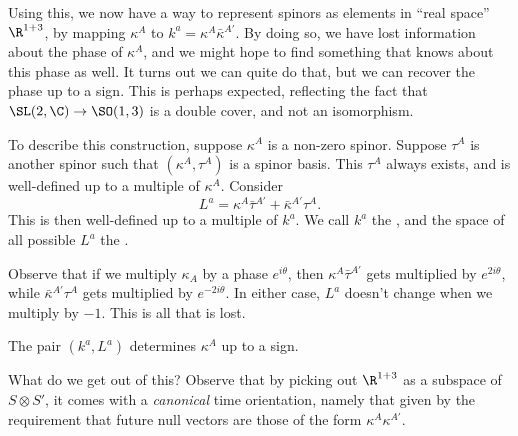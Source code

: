 \documentclass[a4paper]{article}
\begin{document}
Using this, we now have a way to represent spinors as elements in ``real space'' $\R^{1 + 3}$, by mapping $\kappa^A$ to $k^a = \kappa^A \bar{\kappa}^{A'}$. By doing so, we have lost information about the phase of $\kappa^A$, and we might hope to find something that knows about this phase as well. It turns out we can quite do that, but we can recover the phase up to a sign. This is perhaps expected, reflecting the fact that $\SL(2, \C) \to \SO(1, 3)$ is a double cover, and not an isomorphism.

To describe this construction, suppose $\kappa^A$ is a non-zero spinor. Suppose $\tau^A$ is another spinor such that $(\kappa^A, \tau^A)$ is a spinor basis. This $\tau^A$ always exists, and is well-defined up to a multiple of $\kappa^A$. Consider
\[
  L^a = \kappa^A \bar{\tau}^{A'} + \bar{\kappa}^{A'} \tau^A.
\]
This is then well-defined up to a multiple of $k^a$. We call $k^a$ the , and the space of all possible $L^a$ the .

Observe that if we multiply $\kappa_A$ by a phase $e^{i\theta}$, then $\kappa^A \bar{\tau}^{A'}$ gets multiplied by $e^{2i\theta}$, while $\bar{\kappa}^{A'} \tau^A$ gets multiplied by $e^{-2i\theta}$. In either case, $L^a$ doesn't change when we multiply by $-1$. This is all that is lost.

\begin{lemma}
  The pair $(k^a, L^a)$ determines $\kappa^A$ up to a sign. %
\end{lemma}

What do we get out of this? Observe that by picking out $\R^{1 + 3}$ as a subspace of $S \otimes S'$, it comes with a \emph{canonical} time orientation, namely that given by the requirement that future null vectors are those of the form $\kappa^A \kappa^{A'}$.

\printindex
\end{document}
